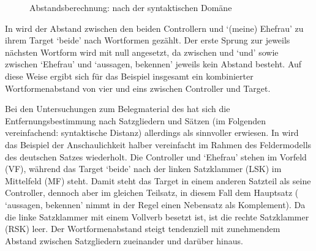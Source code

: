 \begin{figure}
\vspace{.5\baselineskip}
\caption{Abstandsberechnung: nach der syntaktischen Domäne}
\label{fig:caodirdist_syn}
\end{figure}

In  wird der Abstand zwischen den beiden Controllern
 und  `(meine) Ehefrau' zu ihrem Target
 `beide' nach Wortformen gezählt. Der erste Sprung zur jeweils
nächsten Wortform wird mit null angesetzt, da zwischen  und
 `und' sowie zwischen  `Ehefrau' und
 `aussagen, bekennen' jeweils kein Abstand besteht. Auf
diese Weise ergibt sich für das Beispiel insgesamt ein kombinierter Wortformenabstand von vier und
eins zwischen Controller und Target.

Bei den Untersuchungen zum Belegmaterial des \CAO{} hat sich die
Entfernungsbestimmung nach Satzgliedern und Sätzen (im Folgenden vereinfachend:
syntaktische Distanz) allerdings als sinnvoller erwiesen. In
 wird das Beispiel der Anschaulichkeit halber
vereinfacht im Rahmen des Feldermodells des deutschen Satzes
\autocites{drach1963}{woellstein2010}[vgl.\ auch][43--51]{mueller2020}
wiederholt. Die Controller  und  `Ehefrau'
stehen im Vorfeld (VF), während das Target  `beide' nach der
linken Satzklammer (LSK) im Mittelfeld (MF) steht. Damit steht das Target in
einem anderen Satzteil als seine Controller, dennoch aber im gleichen Teilsatz,
in diesem Fall dem Hauptsatz ( `aussagen, bekennen' nimmt
in der Regel einen Nebensatz als Komplement). Da die linke Satzklammer mit
einem Vollverb besetzt ist, ist die rechte Satzklammer (RSK) leer. Der
Wortformenabstand steigt tendenziell mit zunehmendem Abstand zwischen
Satzgliedern zueinander und darüber hinaus.

